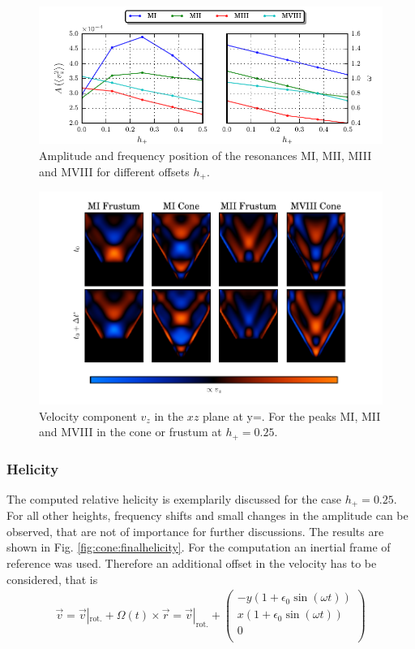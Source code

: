 \begin{figure}[!tp]
  \centering
  \includegraphics{gfx/cone/final/amp_pos.pdf}
  \caption{
      \label{fig:cone:finalampmax}Amplitude and frequency position of the resonances M\RN{1}, M\RN{2}, M\RN{3} and M\RN{8}
      for different offsets $h_+$.
    }
\end{figure}
\begin{figure}[!bp]
  \centering
  \includegraphics{gfx/cone/final/modes.pdf}
  \caption{
      \label{fig:cone:finalmodesexp}
      Velocity component $v_z$ in the $xz$ plane at y=.
       For the peaks M\RN{1}, M\RN{2} and M\RN{8} in the cone or frustum at $h_+=0.25$.
    }
\end{figure}
\clearpage

\subsubsection{Helicity}

The computed relative helicity is exemplarily discussed for the case ${h_+=0.25}$.
For all other heights, frequency shifts and small changes in the amplitude can be observed,
that are not of importance for further discussions.
The results are shown in Fig. \ref{fig:cone:finalhelicity}.
For the computation an inertial frame of reference was used.
Therefore an additional offset in the velocity has to be considered, that is
\begin{align}
    \vec{v} = \vec{v}|_{\text{rot.}} + \Omega(t) \times \vec{r} = \vec{v}|_{\text{rot.}} +
     \begin{pmatrix}
           -y (1 + \epsilon_0 \sin(\omega t)) \\
           x ( 1 + \epsilon_0 \sin(\omega t)) \\
           0\\
         \end{pmatrix}
\end{align}

